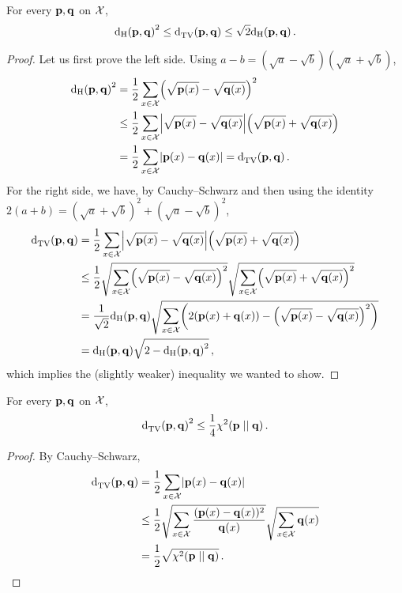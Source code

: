 \tbc
{}


\begin{lemma}
  \label{app:distances:hellinger}
For every $\mathbf{p},\mathbf{q}$ on $\mathcal{X}$, 
  \[
    \hellinger{\p}{\q}^2 \leq \totalvardist{\p}{\q} \leq \sqrt{2}\hellinger{\p}{\q}\,.
  \]
\end{lemma}
\begin{proof}
  Let us first prove the left side. Using $a-b=(\sqrt{a}-\sqrt{b})(\sqrt{a}+\sqrt{b})$,
  \begin{align*}
      \hellinger{\p}{\q}^2
      &= \frac{1}{2}\sum_{x\in\domain} \Paren{\sqrt{\p(x)}-\sqrt{\q(x)}}^2 \\
      &\leq \frac{1}{2}\sum_{x\in\domain} \abs{\sqrt{\p(x)}-\sqrt{\q(x)}}\Paren{\sqrt{\p(x)}+\sqrt{\q(x)}} \\
      &= \frac{1}{2}\sum_{x\in\domain} \abs{\p(x)-\q(x)} = \totalvardist{\p}{\q}\,.
  \end{align*}
 For the right side, we have, by Cauchy--Schwarz and then using the identity $2(a+b) = (\sqrt{a}+\sqrt{b})^2+(\sqrt{a}-\sqrt{b})^2$,
   \begin{align*}
      \totalvardist{\p}{\q} &= \frac{1}{2}\sum_{x\in\domain} \abs{\sqrt{\p(x)}-\sqrt{\q(x)}}\Paren{\sqrt{\p(x)}+\sqrt{\q(x)}}  \\
      &\leq \frac{1}{2}\sqrt{\sum_{x\in\domain} \Paren{\sqrt{\p(x)}-\sqrt{\q(x)}}^2}\sqrt{\sum_{x\in\domain} \Paren{\sqrt{\p(x)}+\sqrt{\q(x)}}^2} \\
      &= \frac{1}{\sqrt{2}}\hellinger{\p}{\q}\sqrt{\sum_{x\in\domain} \Paren{2(\p(x)+\q(x))-\Paren{\sqrt{\p(x)}-\sqrt{\q(x)}}^2 }}\\
      &= \hellinger{\p}{\q}\sqrt{2-\hellinger{\p}{\q}^2 }\,,
  \end{align*}
  which implies the (slightly weaker) inequality we wanted to show.
\end{proof}

\begin{lemma}
  \label{app:distances:chi2:tv}
For every $\mathbf{p},\mathbf{q}$ on $\mathcal{X}$, 
  \[
    \totalvardist{\p}{\q}^2 \leq \frac{1}{4}\chisquare{\p}{\q}\,.
  \]
\end{lemma}
\begin{proof}
  By Cauchy--Schwarz, 
  \begin{align*}
      \totalvardist{\p}{\q} &= \frac{1}{2}\sum_{x\in\domain} \abs{\p(x)-\q(x)} \\
      &\leq \frac{1}{2}\sqrt{\sum_{x\in\domain} \frac{(\p(x)-\q(x))^2}{\q(x)}}\sqrt{\sum_{x\in\domain} \q(x)} \\
      &= \frac{1}{2}\sqrt{\chisquare{\p}{\q}}\,.
  \end{align*}
\end{proof}

